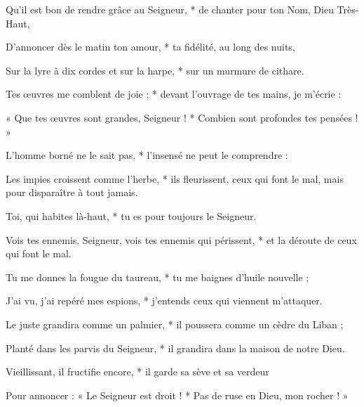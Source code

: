 \item Qu'il est bon de rendre grâce au Seigneur, * de chanter pour ton Nom, Dieu Très-Haut,
\item D'annoncer dès le matin ton amour, * ta fidélité, au long des nuits,
\item Sur la lyre à dix cordes et sur la harpe, * sur un murmure de cithare.
\item Tes œuvres me comblent de joie ; * devant l'ouvrage de tes mains, je m'écrie :
\item « Que tes œuvres sont grandes, Seigneur ! * Combien sont profondes tes pensées ! »
\item L'homme borné ne le sait pas, * l'insensé ne peut le comprendre :
\item Les impies croissent comme l'herbe, * ils fleurissent, ceux qui font le mal, mais pour disparaître à tout jamais.
\item Toi, qui habites là-haut, * tu es pour toujours le Seigneur.
\item Vois tes ennemis, Seigneur, vois tes ennemis qui périssent, * et la déroute de ceux qui font le mal.
\item Tu me donnes la fougue du taureau, * tu me baignes d'huile nouvelle ;
\item J'ai vu, j'ai repéré mes espions, * j'entends ceux qui viennent m'attaquer.
\item Le juste grandira comme un palmier, * il poussera comme un cèdre du Liban ;
\item Planté dans les parvis du Seigneur, * il grandira dans la maison de notre Dieu.
\item Vieillissant, il fructifie encore, * il garde sa sève et sa verdeur
\item Pour annoncer : « Le Seigneur est droit ! * Pas de ruse en Dieu, mon rocher ! »
